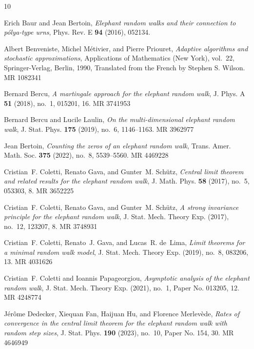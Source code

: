 \documentclass[12pt]{amsart}
\theoremstyle{plain}
\theoremstyle{remark}
\numberwithin{equation}{section}
\begin{document}
\providecommand{\bysame}{\leavevmode\hbox to3em{\hrulefill}\thinspace}
\providecommand{\MR}{\relax\ifhmode\unskip\space\fi MR }
\providecommand{\MRhref}[2]{%
  \href{http://www.ams.org/mathscinet-getitem?mr=#1}{#2}
}
\providecommand{\href}[2]{#2}
\begin{thebibliography}{10}

Erich Baur and Jean Bertoin, \emph{Elephant random walks and their connection to p\'olya-type urns}, Phys. Rev. E \textbf{94} (2016), 052134.

Albert Benveniste, Michel M\'etivier, and Pierre Priouret, \emph{Adaptive algorithms and stochastic approximations}, Applications of Mathematics (New York), vol.~22, Springer-Verlag, Berlin, 1990, Translated from the French by Stephen S. Wilson. \MR{1082341}

Bernard Bercu, \emph{A martingale approach for the elephant random walk}, J. Phys. A \textbf{51} (2018), no.~1, 015201, 16. \MR{3741953}

Bernard Bercu and Lucile Laulin, \emph{On the multi-dimensional elephant random walk}, J. Stat. Phys. \textbf{175} (2019), no.~6, 1146--1163. \MR{3962977}

Jean Bertoin, \emph{Counting the zeros of an elephant random walk}, Trans. Amer. Math. Soc. \textbf{375} (2022), no.~8, 5539--5560. \MR{4469228}

Cristian~F. Coletti, Renato Gava, and Gunter~M. Sch\"{u}tz, \emph{Central limit theorem and related results for the elephant random walk}, J. Math. Phys. \textbf{58} (2017), no.~5, 053303, 8. \MR{3652225}

Cristian~F. Coletti, Renato Gava, and Gunter~M. Sch\"utz, \emph{A strong invariance principle for the elephant random walk}, J. Stat. Mech. Theory Exp. (2017), no.~12, 123207, 8. \MR{3748931}

Cristian~F. Coletti, Renato~J. Gava, and Lucas~R. de~Lima, \emph{Limit theorems for a minimal random walk model}, J. Stat. Mech. Theory Exp. (2019), no.~8, 083206, 13. \MR{4031626}

Cristian~F. Coletti and Ioannis Papageorgiou, \emph{Asymptotic analysis of the elephant random walk}, J. Stat. Mech. Theory Exp. (2021), no.~1, Paper No. 013205, 12. \MR{4248774}

J\'{e}r\^{o}me Dedecker, Xiequan Fan, Haijuan Hu, and Florence Merlev\`ede, \emph{Rates of convergence in the central limit theorem for the elephant random walk with random step sizes}, J. Stat. Phys. \textbf{190} (2023), no.~10, Paper No. 154, 30. \MR{4646949}


\end{thebibliography}
\end{document}
